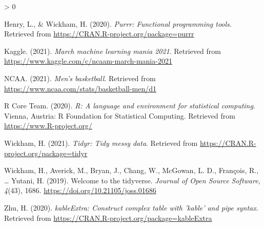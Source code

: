 \documentclass[
  english,
  man,floatsintext]{apa6}
\newlength{\cslhangindent}
\newenvironment{CSLReferences}[2] %
 {%
  \setlength{\parindent}{0pt}
  \ifodd #1 \everypar{\setlength{\hangindent}{\cslhangindent}}\ignorespaces\fi
  \ifnum #2 > 0
  \setlength{\parskip}{#2\baselineskip}
  \fi
 }%
 {}
\begin{document}
\hypertarget{refs}{}
\begin{CSLReferences}{1}{0}
\leavevmode\hypertarget{ref-R-purrr}{}%
Henry, L., \& Wickham, H. (2020). \emph{Purrr: Functional programming tools}. Retrieved from \url{https://CRAN.R-project.org/package=purrr}

\leavevmode\hypertarget{ref-R-Kaggle}{}%
Kaggle. (2021). \emph{March machine learning mania 2021}. Retrieved from \url{https://www.kaggle.com/c/ncaam-march-mania-2021}

\leavevmode\hypertarget{ref-R-NCAA}{}%
NCAA. (2021). \emph{Men's basketball}. Retrieved from \url{https://www.ncaa.com/stats/basketball-men/d1}

\leavevmode\hypertarget{ref-R-base}{}%
R Core Team. (2020). \emph{R: A language and environment for statistical computing}. Vienna, Austria: R Foundation for Statistical Computing. Retrieved from \url{https://www.R-project.org/}

\leavevmode\hypertarget{ref-R-tidyr}{}%
Wickham, H. (2021). \emph{Tidyr: Tidy messy data}. Retrieved from \url{https://CRAN.R-project.org/package=tidyr}

\leavevmode\hypertarget{ref-R-tidyverse}{}%
Wickham, H., Averick, M., Bryan, J., Chang, W., McGowan, L. D., François, R., \ldots{} Yutani, H. (2019). Welcome to the {tidyverse}. \emph{Journal of Open Source Software}, \emph{4}(43), 1686. \url{https://doi.org/10.21105/joss.01686}

\leavevmode\hypertarget{ref-R-kableExtra}{}%
Zhu, H. (2020). \emph{kableExtra: Construct complex table with 'kable' and pipe syntax}. Retrieved from \url{https://CRAN.R-project.org/package=kableExtra}

\end{CSLReferences}

\endgroup
\end{document}
